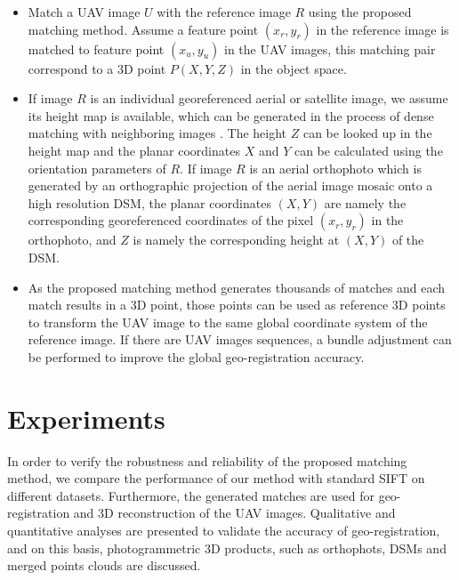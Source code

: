 \begin{itemize}
\itemsep=0.03cm
\item Match a UAV image $U$ with the reference image $R$ using the proposed matching method. Assume a feature point $(x_r,y_r)$ in the reference image is matched to feature point $(x_u,y_u)$ in the UAV images, this matching pair correspond to a 3D point $P(X,Y,Z)$ in the object space.
\item If image $R$ is an individual georeferenced aerial or satellite image, we assume its height map is available, which can be generated in the process of dense matching with neighboring images \cite{d2011semiglobal}. The height $Z$ can be looked up in the height map and the planar coordinates $X$ and $Y$ can be calculated using the orientation parameters of $R$. If image $R$ is an aerial orthophoto which is generated by an orthographic projection of the aerial image mosaic onto a high resolution DSM, the planar coordinates $(X,Y)$ are namely the corresponding georeferenced coordinates of the pixel $(x_r,y_r)$ in the orthophoto, and $Z$ is namely the corresponding height at $(X,Y)$ of the DSM. 
\item As the proposed matching method generates thousands of matches and each match results in a 3D point, those points can be used as reference 3D points to transform the UAV image to the same global coordinate system of the reference image. If there are UAV images sequences, a bundle adjustment can be performed to improve the global geo-registration accuracy. 
\end{itemize}

\section{Experiments}
\label{sec:experiments}
In order to verify the robustness and reliability of the proposed matching method, we compare the performance of our method with standard SIFT on different datasets. 
Furthermore, the generated matches are used for geo-registration and 3D reconstruction of the UAV images. 
Qualitative and quantitative analyses are presented to validate the accuracy of geo-registration, and on this basis, photogrammetric 3D products, such as orthophots, DSMs and merged points clouds are discussed.

